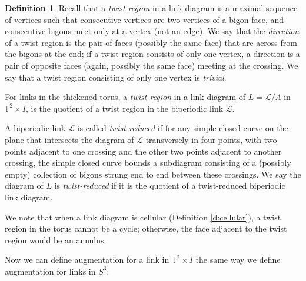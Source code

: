 \documentclass[11pt]{amsart}
\newcommand{\Sp}{{S}}
\newcommand{\torus}{{\mathbb{T}^2}}
\theoremstyle{plain}
\theoremstyle{definition}
\newtheorem{define}[theorem]{Definition}
\begin{document}
\begin{define}
Recall that a \emph{twist region}
in a link diagram is a maximal sequence of vertices
such that consecutive vertices are two vertices of a bigon face,
and consecutive bigons meet only at a vertex (not an edge).
We say that the \emph{direction} of a twist region
is the pair of faces (possibly the same face)
that are across from the bigons at the end;
if a twist region consists of only one vertex,
a direction is a pair of opposite faces (again, possibly the same face)
meeting at the crossing.
We say that a twist region consisting of only one vertex
is \emph{trivial}.


For links in the thickened torus,
a \emph{twist region} in a link diagram of $L=\mathcal{L}/\Lambda$ in $\torus
\times I$, is the quotient of a twist region in the biperiodic link
$\mathcal{L}$. 


A biperiodic link
$\mathcal{L}$ is called \emph{twist-reduced} if for any simple closed curve on
the plane that intersects the diagram of $\mathcal{L}$
transversely in four points, with two
points adjacent to one crossing and the other two points adjacent to another
crossing, the simple closed curve bounds a subdiagram consisting of a (possibly
empty) collection of bigons strung end to end between these crossings. We say
the diagram of $L$ is \emph{twist-reduced}
if it is the quotient of a twist-reduced biperiodic
link diagram.
\end{define}


We note that when a link diagram is cellular
(Definition \ref{d:cellular}),
a twist region in the torus cannot be a cycle;
otherwise, the face adjacent to the twist region would be an annulus.


Now we can define augmentation for a link in $\torus \times I$ the same way we
define augmentation for links in $\Sp^3$:
\end{document}
